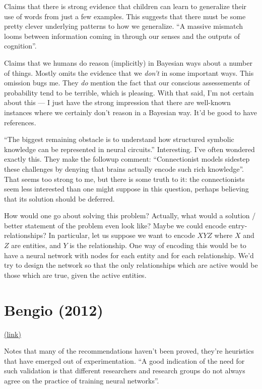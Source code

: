\documentclass[12pt]{report}
\newcommand{\link}[2]{\href{#1}{#2}}
\begin{document}
Claims that there is strong evidence that children can learn to
generalize their use of words from just a few examples.  This suggests
that there must be some pretty clever underlying patterns to how we
generalize.  ``A massive mismatch looms between information coming in
through our senses and the outputs of cognition''.  

Claims that we humans do reason (implicitly) in Bayesian ways about a
number of things.  Mostly omits the evidence that we \emph{don't} in
some important ways.  This omission bugs me.  They \emph{do} mention
the fact that our conscious assessements of probability tend to be
terrible, which is pleasing.  With that said, I'm not certain about
this --- I just have the strong impression that there are well-known
instances where we certainly don't reason in a Bayesian way.  It'd be
good to have references.

``The biggest remaining obstacle is to understand how structured
symbolic knowledge can be represented in neural circuits.''
Interesting.  I've often wondered exactly this.  They make the
followup comment: ``Connectionist models sidestep these challenges by
denying that brains actually encode such rich knowledge''.  That seems
too strong to me, but there is some truth to it: the connectionists
seem less interested than one might suppose in this question, perhaps
believing that its solution should be deferred.

How would one go about solving this problem?  Actually, what would a
solution / better statement of the problem even look like?  Maybe we
could encode entry-relationships?  In particular, let us suppose we
want to encode $X Y Z$ where $X$ and $Z$ are entities, and $Y$ is the
relationship.  One way of encoding this would be to have a neural
network with nodes for each entity and for each relationship.  We'd
try to design the network so that the only relationships which are
active would be those which are true, given the active entities.

\section{Bengio (2012)} 

\link{http://arxiv.org/abs/1206.5533}{(link)}

Notes that many of the recommendations haven't been proved, they're
heuristics that have emerged out of experimentation.  ``A good
indication of the need for such validation is that different
researchers and research groups do not always agree on the practice of
training neural networks''.
\end{document}
